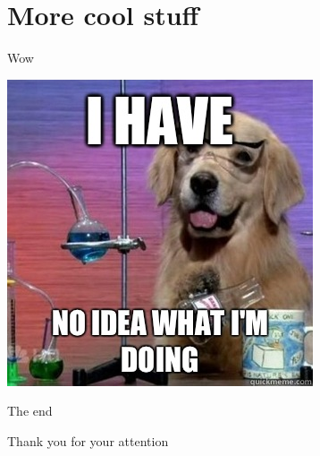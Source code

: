 \documentclass[8pt]{beamer}
\begin{document}
\section{More cool stuff}

\begin{frame}{Wow}
\begin{center}
\vspace*{\fill}

\includegraphics[width=.5\textwidth]{fig/dog.jpg}

\vspace*{\fill}
\end{center}
\end{frame}

\begin{frame}{The end}
\begin{center}
\vspace*{\fill}

\Huge Thank you for your attention

\vspace*{\fill}
\end{center}
\end{frame}

\end{document}
